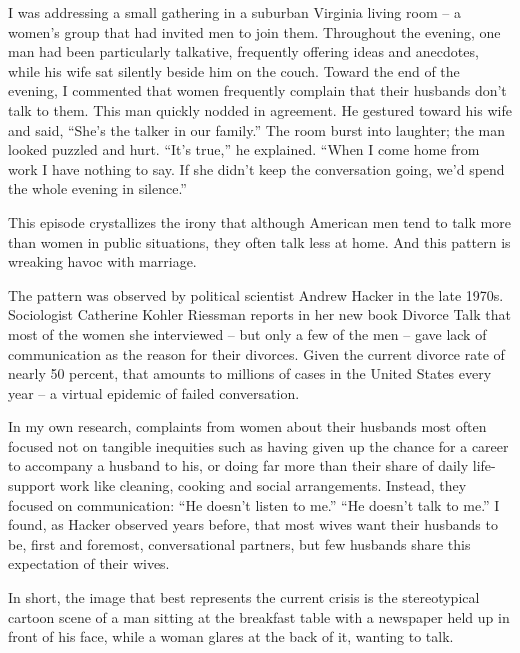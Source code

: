 I was addressing a small gathering in a suburban Virginia living room – a women's group that had invited men to join them. Throughout the evening, one man had been particularly talkative, frequently offering ideas and anecdotes, while his wife sat silently beside him on the couch. Toward the end of the evening, I commented that women frequently complain that their husbands don't talk to them. This man quickly nodded in agreement. He gestured toward his wife and said, ``She's the talker in our family.'' The room burst into laughter; the man looked puzzled and hurt. ``It's true,'' he explained. ``When I come home from work I have nothing to say. If she didn't keep the conversation going, we'd spend the whole evening in silence.''


This episode crystallizes the irony that although American men tend to talk more than women in public situations, they often talk less at home. And this pattern is wreaking havoc with marriage.


The pattern was observed by political scientist Andrew Hacker in the late 1970s. Sociologist Catherine Kohler Riessman reports in her new book Divorce Talk that most of the women she interviewed – but only a few of the men – gave lack of communication as the reason for their divorces. Given the current divorce rate of nearly 50 percent, that amounts to millions of cases in the United States every year  – a virtual epidemic of failed conversation.


In my own research, complaints from women about their husbands most often focused not on tangible inequities such as having given up the chance for a career to accompany a husband to his, or doing far more than their share of daily life-support work like cleaning, cooking and social arrangements. Instead, they focused on communication: ``He doesn't listen to me.'' ``He doesn't talk to me.'' I found, as Hacker observed years before, that most wives want their husbands to be, first and foremost, conversational partners, but few husbands share this expectation of their wives.


In short, the image that best represents the current crisis is the stereotypical cartoon scene of a man sitting at the breakfast table with a newspaper held up in front of his face, while a woman glares at the back of it, wanting to talk.